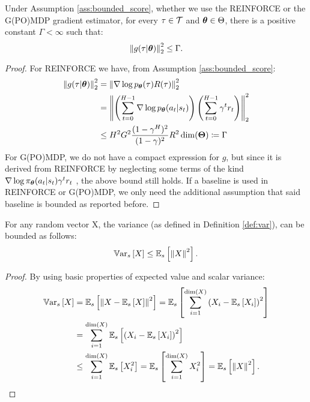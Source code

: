 \begin{lemma}\label{lemma:gbound}
	Under Assumption \ref{ass:bounded_score}, whether we use the REINFORCE or the G(PO)MDP gradient estimator, for every $\tau\in\Tspace$ and $\vtheta\in\Theta$, there is a positive constant $\Gamma<\infty$ such that:
	\[
	\norm[2]{g(\tau\vert\vtheta)}^2 \leq \Gamma.
	\]
\end{lemma}
\begin{proof}
	For REINFORCE we have, from Assumption \ref{ass:bounded_score}:
	\begin{align*}
	\norm[2]{g(\tau\vert\vtheta)}^2 &=
	\norm[2]{\score{\vtheta}{\tau}R(\tau)}^2 \\
	&=\norm[2]{\left(\sum_{t=0}^{H-1}\score{\vtheta}{a_t\vert s_t}\right)\left(\sum_{t=0}^{H-1}\gamma^t r_t\right)}^2 \\
	&\leq H^2G^2\frac{(1-\gamma^H)^2}{(1-\gamma)^2}R^2\dim(\vTheta) \coloneqq \Gamma
	\end{align*}
	For G(PO)MDP, we do not have a compact expression for $g$, but since it is derived from REINFORCE by neglecting some terms of the kind $\nabla \log \pi_{\vtheta}(a_t | s_t)\gamma^t r_t$ \citep{baxter2001infinite,peters2008reinforcement}, the above bound still holds.
	If a baseline is used in REINFORCE or G(PO)MDP, we only need the additional assumption that said baseline is bounded as reported before.
\end{proof}

\begin{lemma}\label{lemma:varineq}
	For any random vector X, the variance (as defined in Definition \ref{def:var}), can be bounded as follows:
	\[
	\Vars{X} \leq \Es{\norm[]{X}^2}.
	\]
\end{lemma}
\begin{proof}
	By using basic properties of expected value and scalar variance:
	\begin{align*}
	\Vars{X} &= \Es{\norm[]{X-\Es{X}}^2} = \Es{\sum_{i=1}^{\dim(X)}\left(X_i-\Es{X_i}\right)^2}\\
	& = \sum_{i=1}^{\dim(X)}\Es{\left(X_i-\Es{X_i}\right)^2} \\
	&\leq \sum_{i=1}^{\dim(X)}\Es{X_i^2} = \Es{\sum_{i=1}^{\dim(X)}X_i^2} = \Es{\norm[]{X}^2}.
	\end{align*}
\end{proof}

